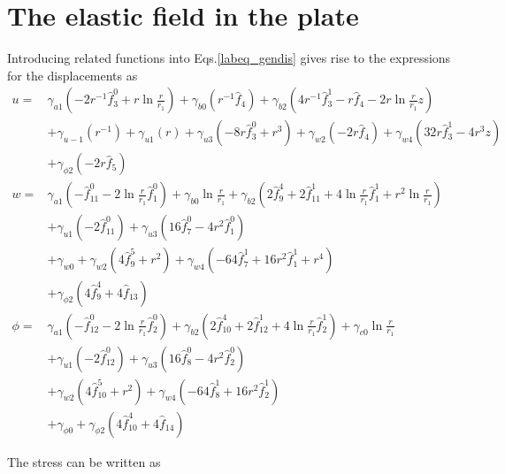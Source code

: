 \documentclass[12pt,sort&compress,fleqn,3p]{elsarticle}
\begin{document}
\section{The elastic field in the plate}
Introducing related functions  into Eqs.\eqref{labeq_gendis} gives rise to the expressions for the
displacements as
\begin{equation}
\begin{split}\label{labeq_displacements}
u =&  \gamma_{a1} ( -2r^{-1} \hat{f}^0_3  +  r\ln\frac{r}{r_1} ) +  \gamma_{b0} ( r^{-1}\hat{f}_4)  +  \gamma_{b2}(4r^{-1}\hat{f}^1_3- r\hat{f}_4 -2r\ln\frac{r}{r_1}z )   \\
&+\gamma_{u-1}(r^{-1}) +  \gamma_{u1}(r) + \gamma_{u3} ( -8r\hat{f}^0_3 + r^3)  +  \gamma_{w2} (-2r\hat{f}_4) + \gamma_{w4} (32r\hat{f}^1_3 -4r^3z)\\
& +  \gamma_{\phi2} (-2r\hat{f}_5)    \\
w=&    \gamma_{a1} ( -\hat{f}^0_{11} -2\ln\frac{r}{r_1} \hat{f}^0_1 )  + \gamma_{b0}\ln\frac{r}{r_1}   +  \gamma_{b2}(2\hat{f}^4_9 + 2\hat{f}^1_{11} + 4 \ln\frac{r}{r_1} \hat{f}^1_1  +  r^2  \ln\frac{r}{r_1} )  \\
&+  \gamma_{u1} (- 2\hat{f}^0_{11} ) +  \gamma_{u3} (16 \hat{f}^0_7 - 4r^2\hat{f}^0_1 ) \\
& + \gamma_{w0}  +  \gamma_{w 2} (4\hat{f}^5_9 +r^2 ) + \gamma_{w4}(-64\hat{f}^1_7 + 16r^2\hat{f}^1_1 + r^4 ) \\
& + \gamma_{\phi 2} (4\hat{f}^4_{9}+ 4\hat{f}_{13}) \\
\phi=& \gamma_{a1}  (-\hat{f}^0_{12}  - 2\ln\frac{r}{r_1}\hat{f}^0_2 )    +   \gamma_{b2}(2\hat{f}^4_{10} + 2\hat{f}^1_{12} + 4 \ln\frac{r}{r_1}\hat{f}^1_2 )  + \gamma_{c0} \ln\frac{r}{r_1}  \\
&+ \gamma_{u1} (-2\hat{f}^0_{12})  +\gamma_{u3} (16\hat{f}^0_{8} - 4r^2\hat{f}^0_2) \\
&  + \gamma_{w 2} (4\hat{f}^5_{10} + r^2)  +\gamma_{w4} (-64\hat{f}^1_{8} + 16r^2\hat{f}^1_2 )  \\
&  +\gamma_{\phi0} + \gamma_{\phi 2}( 4\hat{f}^4_{10} +4\hat{f}_{14})
\end{split}
\end{equation}

The stress can be written as
\end{document}
